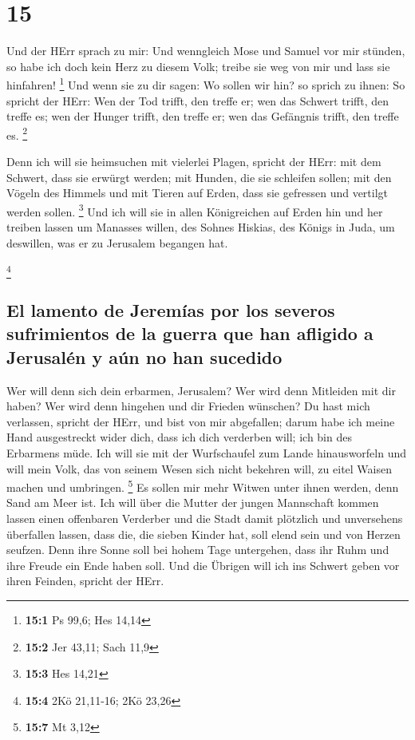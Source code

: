 \hypertarget{section-14}{%
\section{15}\label{section-14}}

 Und der HErr sprach zu mir: Und wenngleich Mose und
Samuel vor mir stünden, so habe ich doch kein Herz zu diesem Volk;
treibe sie weg von mir und lass sie hinfahren! \footnote{\textbf{15:1}
  Ps 99,6; Hes 14,14}  Und wenn sie zu dir sagen: Wo
sollen wir hin? so sprich zu ihnen: So spricht der HErr: Wen der Tod
trifft, den treffe er; wen das Schwert trifft, den treffe es; wen der
Hunger trifft, den treffe er; wen das Gefängnis trifft, den treffe es.
\footnote{\textbf{15:2} Jer 43,11; Sach 11,9}

 Denn ich will sie heimsuchen mit vielerlei Plagen,
spricht der HErr: mit dem Schwert, dass sie erwürgt werden; mit Hunden,
die sie schleifen sollen; mit den Vögeln des Himmels und mit Tieren auf
Erden, dass sie gefressen und vertilgt werden sollen. \footnote{\textbf{15:3}
  Hes 14,21}  Und ich will sie in allen Königreichen auf
Erden hin und her treiben lassen um Manasses willen, des Sohnes Hiskias,
des Königs in Juda, um deswillen, was er zu Jerusalem begangen hat.

\footnote{\textbf{15:4} 2Kö 21,11-16; 2Kö 23,26}

\hypertarget{el-lamento-de-jeremuxedas-por-los-severos-sufrimientos-de-la-guerra-que-han-afligido-a-jerusaluxe9n-y-auxfan-no-han-sucedido}{%
\subsection{El lamento de Jeremías por los severos sufrimientos de la
guerra que han afligido a Jerusalén y aún no han
sucedido}\label{el-lamento-de-jeremuxedas-por-los-severos-sufrimientos-de-la-guerra-que-han-afligido-a-jerusaluxe9n-y-auxfan-no-han-sucedido}}

 Wer will denn sich dein erbarmen, Jerusalem? Wer wird
denn Mitleiden mit dir haben? Wer wird denn hingehen und dir Frieden
wünschen?  Du hast mich verlassen, spricht der HErr, und
bist von mir abgefallen; darum habe ich meine Hand ausgestreckt wider
dich, dass ich dich verderben will; ich bin des Erbarmens müde.
 Ich will sie mit der Wurfschaufel zum Lande hinausworfeln
und will mein Volk, das von seinem Wesen sich nicht bekehren will, zu
eitel Waisen machen und umbringen. \footnote{\textbf{15:7} Mt 3,12}
 Es sollen mir mehr Witwen unter ihnen werden, denn Sand
am Meer ist. Ich will über die Mutter der jungen Mannschaft kommen
lassen einen offenbaren Verderber und die Stadt damit plötzlich und
unversehens überfallen lassen,  dass die, die sieben
Kinder hat, soll elend sein und von Herzen seufzen. Denn ihre Sonne soll
bei hohem Tage untergehen, dass ihr Ruhm und ihre Freude ein Ende haben
soll. Und die Übrigen will ich ins Schwert geben vor ihren Feinden,
spricht der HErr.

